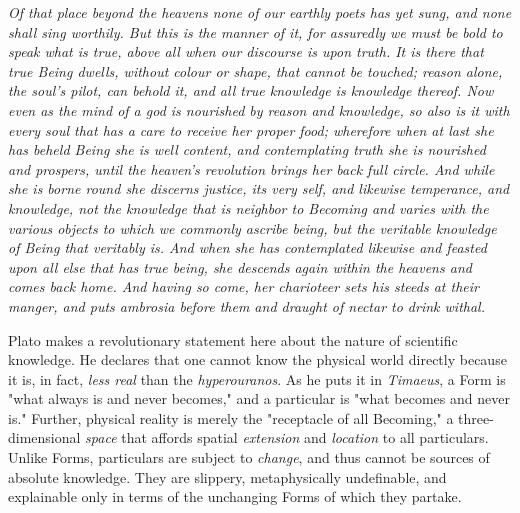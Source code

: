 \begin{displayquote}
	\textit{Of that place beyond the heavens none of our earthly poets has yet sung, and none shall sing worthily. But this is the manner of it, for assuredly we must be bold to speak what is true, above all when our discourse is upon truth. It is there that true Being dwells, without colour or shape, that cannot be touched; reason alone, the soul's pilot, can behold it, and all true knowledge is knowledge thereof. Now even as the mind of a god is nourished by reason and knowledge, so also is it with every soul that has a care to receive her proper food; wherefore when at last she has beheld Being she is well content, and contemplating truth she is nourished and prospers, until the heaven's revolution brings her back full circle. And while she is borne round she discerns justice, its very self, and likewise temperance, and knowledge, not the knowledge that is neighbor to Becoming and varies with the various objects to which we commonly ascribe being, but the veritable knowledge of Being that veritably is. And when she has contemplated likewise and feasted upon all else that has true being, she descends again within the heavens and comes back home. And having so come, her charioteer sets his steeds at their manger, and puts ambrosia before them and draught of nectar to drink withal.}
	\vspace{4mm}
\end{displayquote}

Plato makes a revolutionary statement here about the nature of scientific knowledge. He declares that one cannot know the physical world directly because it is, in fact, \textit{less real} than the \textit{hyperouranos}. As he puts it in \textit{Timaeus}, a Form is "what always is and never becomes," and a particular is "what becomes and never is." Further, physical reality is merely the "receptacle of all Becoming," a three-dimensional \textit{space} that affords spatial \textit{extension} and \textit{location} to all particulars. Unlike Forms, particulars are subject to \textit{change}, and thus cannot be sources of absolute knowledge. They are slippery, metaphysically undefinable, and explainable only in terms of the unchanging Forms of which they partake. \\


